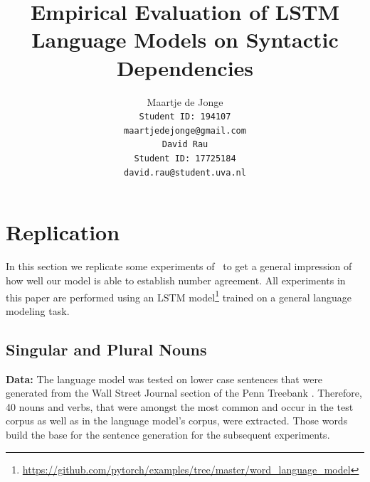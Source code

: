 \documentclass[11pt,a4paper]{article}
\title{Empirical Evaluation of LSTM Language Models \bigskip
on Syntactic Dependencies}
\author{
Maartje de Jonge\\
\tt Student ID: 194107\\
{\tt maartjedejonge@gmail.com} \\\And
David Rau \\
\tt Student ID: 17725184\\
{\tt david.rau@student.uva.nl} \\}
\date{}
\begin{document}
\maketitle














\section{Replication}
\label{replication}

In this section we replicate some experiments of~\citep{Linzen2016} to get a general impression of how well our model is able to establish number agreement.
All experiments in this paper are performed using an LSTM model\footnote{
\url{https://github.com/pytorch/examples/tree/master/word_language_model}
} trained on a general language modeling task.

\subsection{Singular and Plural Nouns}

\textbf{Data:} 
The language model was tested on lower case sentences that were generated from the Wall Street Journal section of the Penn Treebank \citep{Marcus1993}. Therefore, 40 nouns and verbs, that were amongst the most common and occur in the test corpus as well as in the language model's corpus, were extracted. Those words build the base for the sentence generation for the subsequent experiments. 
\end{document}
